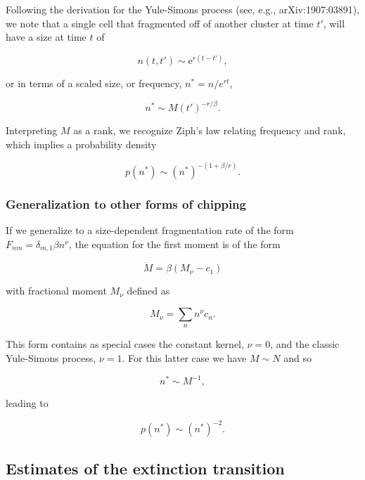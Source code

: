 \documentclass[12pt]{article}
\def\be{\begin{equation}}
\def\ee{\end{equation}}
\def\e{\text{e}}
\begin{document}
Following the derivation for the Yule-Simons process (see, e.g., arXiv:1907:03891), we note that a single cell that fragmented off of another cluster at time $t'$, will have a size at time $t$ of

\be
n(t,t') \sim \e^{r(t-t')}, 
\ee

or in terms of a scaled size, or frequency, $n^* = n/e^{rt}$,

\be
n^* \sim M(t')^{-r/\beta}.
\ee

Interpreting $M$ as a rank, we recognize Ziph's law relating frequency and rank, which implies a probability density

\be
p(n^*) \sim (n^*)^{-(1 + \beta/r)}.
\ee

\subsubsection*{Generalization to other forms of chipping}
If we generalize to a size-dependent fragmentation rate of the form $F_{nm} = \delta_{m,1}\beta n^{\nu}$, the equation for the first moment is of the form

\be
\dot{M} = \beta(M_{\nu} - c_1)
\ee

with fractional moment $M_{\nu}$ defined as

\be
M_{\nu} = \sum_n n^{\nu}c_n.
\ee

This form contains as special cases the constant kernel, $\nu= 0$, and the classic Yule-Simons process, $\nu=1$. For this latter case we have $M \sim N$ and so

\be
n^* \sim M^{-1},
\ee

leading to

\be
p(n^*) \sim (n^*)^{-2}.
\ee
\subsection*{Estimates of the extinction transition}



\end{document}
